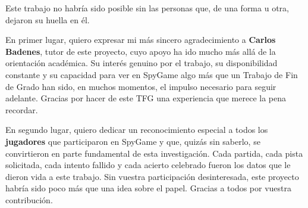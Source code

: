 \documentclass[../main.tex]{subfiles}
\begin{document}
Este trabajo no habría sido posible sin las personas que, de una forma u otra, dejaron su huella en él.

En primer lugar, quiero expresar mi más sincero agradecimiento a \textbf{Carlos Badenes}, tutor de este proyecto, cuyo apoyo ha ido mucho más allá de la orientación académica. Su interés genuino por el trabajo, su disponibilidad constante y su capacidad para ver en SpyGame algo más que un Trabajo de Fin de Grado han sido, en muchos momentos, el impulso necesario para seguir adelante. Gracias por hacer de este TFG una experiencia que merece la pena recordar.

En segundo lugar, quiero dedicar un reconocimiento especial a todos los \textbf{jugadores} que participaron en SpyGame y que, quizás sin saberlo, se convirtieron en parte fundamental de esta investigación. Cada partida, cada pista solicitada, cada intento fallido y cada acierto celebrado fueron los datos que le dieron vida a este trabajo. Sin vuestra participación desinteresada, este proyecto habría sido poco más que una idea sobre el papel. Gracias a todos por vuestra contribución.
\end{document}
